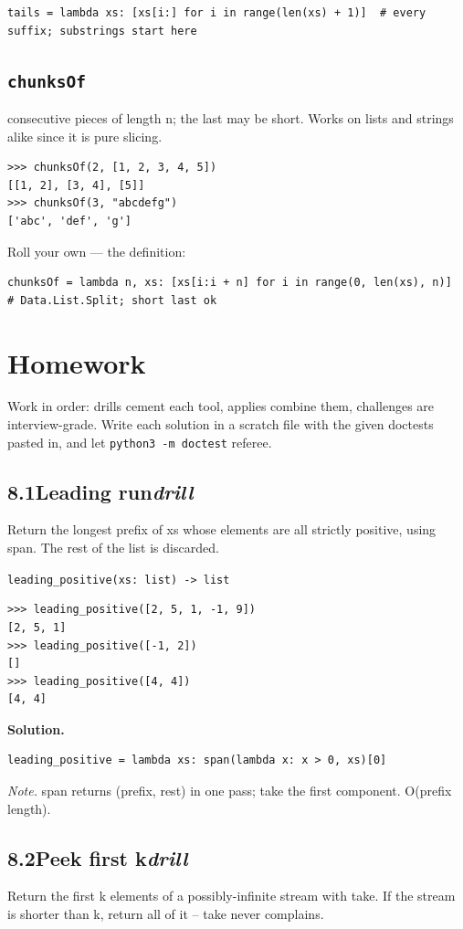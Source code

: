 \documentclass[10pt,letterpaper]{book}
\begin{document}
\begin{lstlisting}[style=ex]
tails = lambda xs: [xs[i:] for i in range(len(xs) + 1)]  # every suffix; substrings start here
\end{lstlisting}
\subsection{\texttt{chunksOf}}\label{def:chunksOf}
consecutive pieces of length n; the last may be short. Works on lists and strings alike since it is pure slicing.
\begin{lstlisting}[style=ex]
>>> chunksOf(2, [1, 2, 3, 4, 5])
[[1, 2], [3, 4], [5]]
>>> chunksOf(3, "abcdefg")
['abc', 'def', 'g']
\end{lstlisting}

Roll your own --- the definition:

\begin{lstlisting}[style=ex]
chunksOf = lambda n, xs: [xs[i:i + n] for i in range(0, len(xs), n)]  # Data.List.Split; short last ok
\end{lstlisting}
\section{Homework}
Work in order: drills cement each tool, applies combine them,
challenges are interview-grade. Write each solution in a scratch file with
the given doctests pasted in, and let \texttt{python3 -m doctest} referee.
\subsection*{8.1\quad Leading run\hfill\textnormal{\textit{drill}}}
Return the longest prefix of xs whose elements are all strictly positive, using span. The rest of the list is discarded.

\noindent\texttt{leading\_positive(xs: list) -> list}
\begin{lstlisting}[style=ex]
>>> leading_positive([2, 5, 1, -1, 9])
[2, 5, 1]
>>> leading_positive([-1, 2])
[]
>>> leading_positive([4, 4])
[4, 4]
\end{lstlisting}
\noindent\textbf{Solution.}
\begin{lstlisting}[style=code]
leading_positive = lambda xs: span(lambda x: x > 0, xs)[0]
\end{lstlisting}
\noindent\textit{Note.} span returns (prefix, rest) in one pass; take the first component. O(prefix length).

\subsection*{8.2\quad Peek first k\hfill\textnormal{\textit{drill}}}
Return the first k elements of a possibly-infinite stream with take. If the stream is shorter than k, return all of it -- take never complains.
\end{document}
